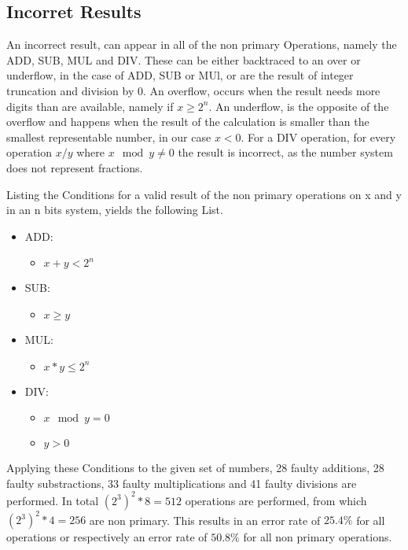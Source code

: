 \documentclass{aiaa-tc}
\begin{document}
\subsection{Incorret Results}
An incorrect result, can appear in all of the non primary Operations, namely the ADD, SUB, MUL and DIV. These can be either backtraced to an over or underflow,
in the case of ADD, SUB or MUl, or are the result of integer truncation and division by 0.
An overflow, occurs when the result needs more digits than are available, namely if $x \geq 2^n$. An underflow, is the opposite of the overflow and happens when the result
of the calculation is smaller than the smallest representable number, in our case $x < 0$.
For a DIV operation, for every operation $x/y$ where $x \mod y \neq 0$ the result is incorrect, as the number system does not represent fractions.

Listing the Conditions for a valid result of the non primary operations on x and y in an n bits system, yields the following List.
\begin{itemize}
    \item ADD: \begin{itemize}
        \item $x + y < 2^n$
    \end{itemize}
    \item SUB: \begin{itemize}
        \item $x \geq y $
    \end{itemize}
    \item MUL: \begin{itemize}
        \item $x * y \leq 2^n$
    \end{itemize}
    \item DIV: \begin{itemize}
        \item $x \mod y = 0$
        \item $y > 0$
    \end{itemize}
\end{itemize}

Applying these Conditions to the given set of numbers, 28 faulty additions, 28 faulty substractions, 33 faulty multiplications and 41 faulty divisions are performed.
In total $(2^{3})^{2} * 8 = 512$ operations are performed, from which $(2^{3})^{2} * 4 = 256$ are non primary. This results in an error rate of $25.4 \%$ for all operations
or respectively an error rate of $50.8 \%$ for all non primary operations.
\end{document}

